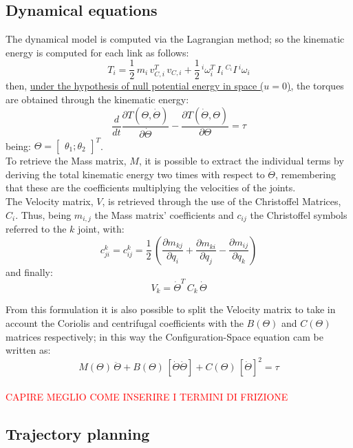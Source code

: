



\subsection{Dynamical equations}
The dynamical model is computed via the Lagrangian method; so the kinematic energy is computed for each link as follows:
$$T_i = \frac{1}{2}\,m_i\,v_{C,i}^T\,v_{C,i} + \frac{1}{2}\,^{i}\omega_i^{T}\,I_i\,^{C_i}I\,^{i}\omega_{i}$$
then, \underline{under the hypothesis of null potential energy in space ($u=0$)}, the torques are obtained through the kinematic energy:
$$\dfrac{d}{dt}\dfrac{\partial{T(\Theta,\dot{\Theta})}}{\partial{\dot{\Theta}}}-\dfrac{\partial{T(\dot{\Theta},\Theta)}}{\partial{\Theta}}=\tau$$
being: 
$\Theta = \begin{bmatrix} \theta_1;\theta_2\end{bmatrix}^{T}$.\\

To retrieve the Mass matrix, $M$, it is possible to extract the individual terms by deriving the total kinematic energy two times with respect to $\dot{\Theta}$, remembering that these are the coefficients multiplying the velocities of the joints.\\

The Velocity matrix, $V$, is retrieved through the use of the Christoffel Matrices, $C_i$. Thus, being $m_{i,j}$ the Mass matrix' coefficients and $c_{ij}$ the Christoffel symbols referred to the $k$ joint, with:
$$c_{ji}^k=c_{ij}^k=\frac{1}{2}\,\left(\dfrac{\partial{m_{kj}}}{\partial{q_i}}+\dfrac{\partial{m_{ki}}}{\partial{q_j}}-\dfrac{\partial{m_{ij}}}{\partial{q_k}}\right)$$
and finally:
$$V_k = \dot{\Theta}^{T}\,C_k\,\dot{\Theta}$$

From this formulation it is also possible to split the Velocity matrix to take in account the Coriolis and centrifugal coefficients with the $B(\Theta)$ and $C(\Theta)$ matrices respectively; in this way the Configuration-Space equation cam be written as:
$$M(\Theta)\,\ddot{\Theta}+B(\Theta)\,[\dot{\Theta}\dot{\Theta}]+C(\Theta)\,[\dot{\Theta}]^2=\tau$$
\\
\textcolor{red}{CAPIRE MEGLIO COME INSERIRE I TERMINI DI FRIZIONE}

\subsection{Trajectory planning}

